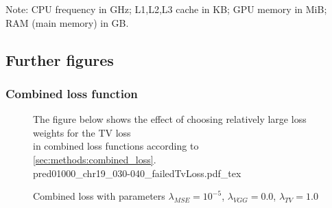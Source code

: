 \begin{landscape}
Note: CPU frequency in GHz; L1,L2,L3 cache in KB; GPU memory in MiB; RAM (main memory) in GB.
\end{landscape}

\subsection{Further figures}
\subsubsection{Combined loss function}
\begin{figure}[htbp]
    \centering
    \scriptsize
    \raggedright{The figure below shows the effect of choosing relatively large loss weights for the TV loss\\in combined loss functions according to \cref{sec:methods:combined_loss}.\\[2mm]}
    {pred01000_chr19_030-040_failedTvLoss.pdf_tex}
    \caption{Combined loss with parameters $\lambda_\mathit{MSE}=10^{-5}$, $\lambda_\mathit{VGG}=0.0$, $\lambda_\mathit{TV}=1.0$}
    \label{fig:appendix:failed_tv_loss}
\end{figure}
\clearpage

